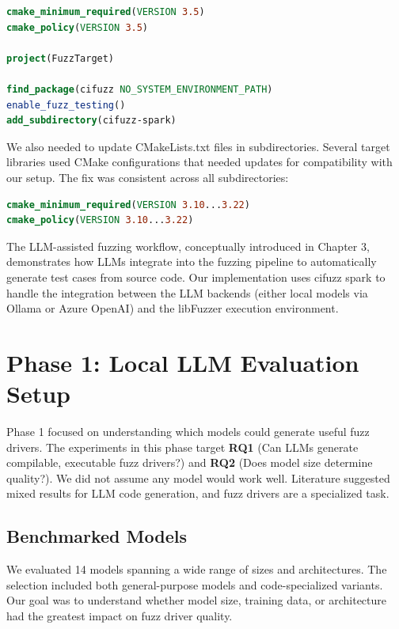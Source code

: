 \begin{lstlisting}[language=cmake, caption={CMake Fuzzing Configuration}]
cmake_minimum_required(VERSION 3.5)
cmake_policy(VERSION 3.5)

project(FuzzTarget)

find_package(cifuzz NO_SYSTEM_ENVIRONMENT_PATH)
enable_fuzz_testing()
add_subdirectory(cifuzz-spark)
\end{lstlisting}

We also needed to update CMakeLists.txt files in subdirectories. Several target libraries used CMake configurations that needed updates for compatibility with our setup. The fix was consistent across all subdirectories:

\begin{lstlisting}[language=cmake, caption={Subdirectory CMake Updates}]
cmake_minimum_required(VERSION 3.10...3.22)
cmake_policy(VERSION 3.10...3.22)
\end{lstlisting}

The LLM-assisted fuzzing workflow, conceptually introduced in Chapter 3, demonstrates how LLMs integrate into the fuzzing pipeline to automatically generate test cases from source code. Our implementation uses cifuzz spark to handle the integration between the LLM backends (either local models via Ollama or Azure OpenAI) and the libFuzzer execution environment.

\section{Phase 1: Local LLM Evaluation Setup}
\label{sec:impl_phase1}

Phase 1 focused on understanding which models could generate useful fuzz drivers. The experiments in this phase target \textbf{RQ1} (Can LLMs generate compilable, executable fuzz drivers?) and \textbf{RQ2} (Does model size determine quality?). We did not assume any model would work well. Literature suggested mixed results for LLM code generation, and fuzz drivers are a specialized task.

\subsection{Benchmarked Models}

We evaluated 14 models spanning a wide range of sizes and architectures. The selection included both general-purpose models and code-specialized variants. Our goal was to understand whether model size, training data, or architecture had the greatest impact on fuzz driver quality.

